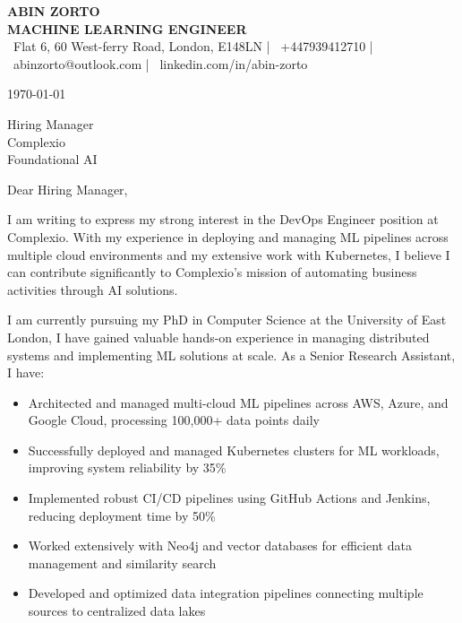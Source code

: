 \documentclass[10pt,a4paper]{article}
\begin{document}

\begin{center}
    {\color{primary}\Large\textbf{ABIN ZORTO}}\\[0.2em]
    {\color{secondary}\large\textbf{MACHINE LEARNING ENGINEER}}\\[0.3em]
    
    \small\color{secondary}
    \faMapMarker\ Flat 6, 60 West-ferry Road, London, E148LN |
    \faMobile\ +447939412710 |
    \faEnvelope\ abinzorto@outlook.com |
    \faLinkedin\ linkedin.com/in/abin-zorto
\end{center}

\vspace{1em}
\today

\vspace{1em}
Hiring Manager\\
Complexio\\
Foundational AI

\vspace{1em}
Dear Hiring Manager,

I am writing to express my strong interest in the DevOps Engineer position at Complexio. With my experience in deploying and managing ML pipelines across multiple cloud environments and my extensive work with Kubernetes, I believe I can contribute significantly to Complexio's mission of automating business activities through AI solutions.

I am currently pursuing my PhD in Computer Science at the University of East London, I have gained valuable hands-on experience in managing distributed systems and implementing ML solutions at scale. As a Senior Research Assistant, I have:

\begin{itemize}
    \item Architected and managed multi-cloud ML pipelines across AWS, Azure, and Google Cloud, processing 100,000+ data points daily
    \item Successfully deployed and managed Kubernetes clusters for ML workloads, improving system reliability by 35\%
    \item Implemented robust CI/CD pipelines using GitHub Actions and Jenkins, reducing deployment time by 50\%
    \item Worked extensively with Neo4j and vector databases for efficient data management and similarity search
    \item Developed and optimized data integration pipelines connecting multiple sources to centralized data lakes
\end{itemize}
\end{document}
